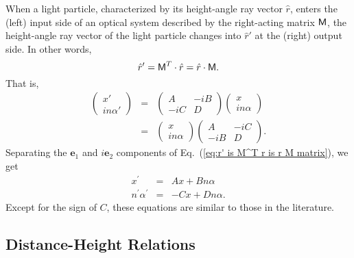 \documentclass[11pt,twocolumn]{article}
\begin{document}
When a light particle, characterized by its height-angle ray vector $\hat r$, enters the (left) input side  of an optical system described by the right-acting matrix $\textsf M$, 
the height-angle ray vector of the light particle changes into $\hat r'$ at the (right) output side.  In other words,
\begin{equation}
\label{eq:r' is M^T r is r M}
\hat r'=\textsf M^T\cdot\hat r=\hat r\cdot\textsf M.
\end{equation}
That is,\cite{SugonMcNamara_2008_arXiv:0812.0664v1_p4}
\begin{eqnarray}
\label{eq:r' is M^T r is r M matrix}
\begin{pmatrix}
x'\\
in\alpha'
\end{pmatrix}
&=&
\begin{pmatrix}
A&-iB\\
-iC&D
\end{pmatrix}
\begin{pmatrix}
x\\
in\alpha
\end{pmatrix}
\nonumber\\
&=&
\begin{pmatrix}
x\\
in\alpha
\end{pmatrix}
\begin{pmatrix}
A&-iC\\
-iB&D
\end{pmatrix}
.
\end{eqnarray}
Separating the $\mathbf e_1$ and $i\mathbf e_2$ components of Eq.~(\ref{eq:r' is M^T r is r M matrix}), we get
\begin{eqnarray}
\label{eq:x' is Ax + Bnalpha}
x^\prime&=&Ax+Bn\alpha\\
\label{eq:n'alpha' is -Cx + Dnalpha}
n^\prime\alpha^\prime&=&-Cx+Dn\alpha.
\end{eqnarray}
Except for the sign of $C$, these equations are similar to those in the literature.



\subsection{Distance-Height Relations}
\end{document}
